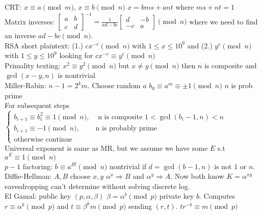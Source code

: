 \documentclass[10pt]{article}
\begin{document}
CRT\@: $x\equiv a\pmod{m}$, $x\equiv b\pmod{n}$ $x=bms+ant$ where $ms+nt=1$\\

Matrix inverses\@: $\begin{bmatrix}
    a & b\\
    c & d
\end{bmatrix}^{-1}=\frac{1}{ad-bc}\begin{bmatrix}
    d & -b\\
    -c & a
\end{bmatrix}\pmod{n}$ where we need to find an inverse $ad-bc\pmod{n}$.\\

RSA short plaintext\@: (1.) $cx^{-e}\pmod{n}$ with $1\le x\le 10^9$ and (2.) $y^e\pmod{n}$ with $1\le y \le 10^9$ looking for $cx^{-e}\equiv y^e\pmod{n}$\\

Primality texting\@: $x^2\equiv y^2\pmod{n}$ but $x\neq y\pmod{n}$ then $n$ is composite and $\gcd(x-y,n)$ is nontrivial\\

Miller-Rabin\@: $n-1=2^k m$. Choose random $a$ $b_0\equiv a^m\equiv \pm 1\pmod{n}$ $n$ is prob prime\\ 
For subsequent steps $\begin{cases}
    b_{i+1}\equiv b_i^2\equiv 1\pmod{n}, & \text{ n is composite }1<\gcd(b_i-1,n)<n\\
    b_{i+1}\equiv -1\pmod{n}, & \text{n is probably prime}\\
    \text{otherwise continue}
\end{cases}$\\

Universal exponent is same as MR, but we assume we have some $E$ s.t $a^E\equiv 1\pmod{n}$\\

$p-1$ factoring\@: $b\equiv a^{B!}\pmod{n}$ nontrivial if $d=\gcd(b-1,n)$ is not $1$ or $n$.\\

Diffie-Hellman\@: $A,B$ choose $x,y$ $\alpha^x\Rightarrow B$ and $\alpha^y\Rightarrow A$. Now both know $K=\alpha^{xy}$ eavesdropping can't determine without solving discrete log.\\

El Gamal\@: public key $(p,\alpha,\beta)$ $\beta=\alpha^b\pmod{p}$ private key $b$. Computes $r\equiv \alpha^k\pmod{p}$ and $t\equiv \beta^k m\pmod{p}$ sending $(r,t)$. $tr^{-b}\equiv m\pmod{p}$\\
\end{document}
